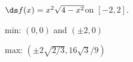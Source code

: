{$\ds f(x) = x^2\sqrt{4-x^2}$\quad  on \quad $[-2,2]$.
}
{min: $(0,0)$ and $(\pm 2,0)$

max: $(\pm 2\sqrt{2/3},16\sqrt{3}/9)$
}
